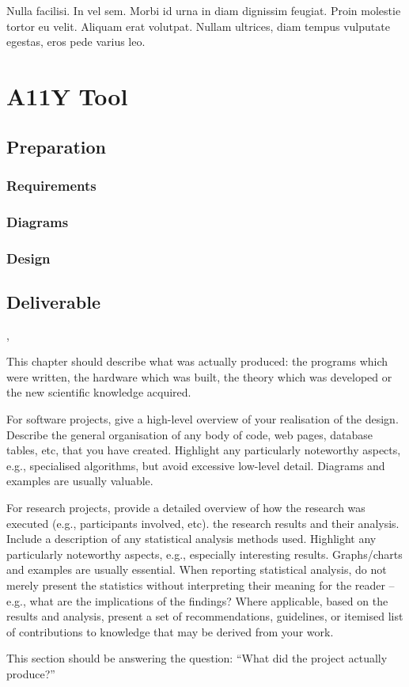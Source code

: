 \begin{savequote}[75mm]
Nulla facilisi. In vel sem. Morbi id urna in diam dignissim feugiat. Proin molestie tortor eu velit. Aliquam erat volutpat. Nullam ultrices, diam tempus vulputate egestas, eros pede varius leo.
\end{savequote}

\chapter{A11Y Tool}
\section{Preparation}
\subsection{Requirements}
\subsection{Diagrams}
\subsection{Design}

\section{Deliverable}
,

This chapter should describe what was actually produced: the programs which
were written, the hardware which was built, the theory which was developed or
the new scientific knowledge acquired.

For software projects, give a high-level overview of your realisation of the
design. Describe the general organisation of any body of code, web pages,
database tables, etc, that you have created. Highlight any particularly
noteworthy aspects, e.g., specialised algorithms, but avoid excessive low-level
detail. Diagrams and examples are usually valuable.

For research projects, provide a detailed overview of how the research was
executed (e.g., participants involved, etc). the research results and their
analysis. Include a description of any statistical analysis methods used.
Highlight any particularly noteworthy aspects, e.g., especially interesting
results. Graphs/charts and examples are usually essential. When reporting
statistical analysis, do not merely present the statistics without interpreting
their meaning for the reader – e.g., what are the implications of the findings?
Where applicable, based on the results and analysis, present a set of
recommendations, guidelines, or itemised list of contributions to knowledge
that may be derived from your work.

This section should be answering the question: “What did the project actually
produce?”
